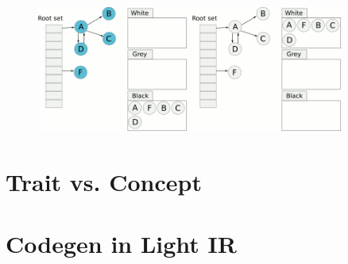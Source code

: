 \documentclass[a4paper]{exam}
\theoremstyle{definition}
\begin{document}
\begin{figure}[htbp]
  \includegraphics[width=5cm]{./img/tri_6.png}
  \includegraphics[width=5cm]{./img/tri_7.png}
\end{figure}
\section{Trait vs. Concept}
\section{Codegen in Light IR}
\end{document}
